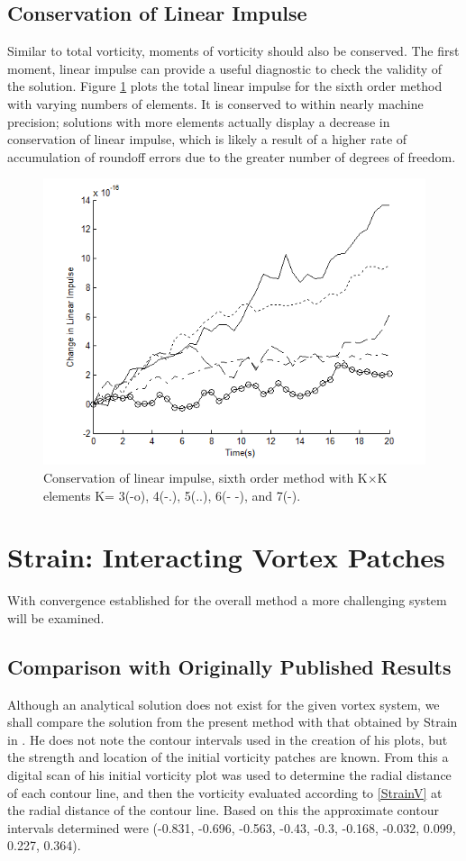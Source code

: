 \documentclass[letterpaper,12pt]{report}
\begin{document}
\subsection{Conservation of Linear Impulse}
Similar to total vorticity, moments of vorticity should also be conserved. The first moment, linear impulse can provide a useful diagnostic to check the validity of the solution. Figure \ref{fig:PLinImp} plots the total linear impulse for the sixth order method with varying numbers of elements. It is conserved to within nearly machine precision; solutions with more elements actually display a decrease in conservation of linear impulse, which is likely a result of a higher rate of accumulation of roundoff errors due to the greater number of degrees of freedom.
\begin{figure}
\centering
\includegraphics[width=1\textwidth]{PLinImp.PNG}
\caption{\label{fig:PLinImp}Conservation of linear impulse, sixth order method with K$\times$K elements K= 3(-o), 4(-.), 5(..), 6(- -), and 7(-).}
\end{figure}

\section{Strain: Interacting Vortex Patches}
With convergence established for the overall method a more challenging system will be examined.
%
\subsection{Comparison with Originally Published Results}\label{SComp}
Although an analytical solution does not exist for the given vortex system, we shall compare the solution from the present method with that obtained by Strain in \cite{Strain1996}. He does not note the contour intervals used in the creation of his plots, but the strength and location of the initial vorticity patches are known. From this a digital scan of his initial vorticity plot was used to determine the radial distance of each contour line, and then the vorticity evaluated according to \eqref{StrainV} at the radial distance of the contour line. Based on this the approximate contour intervals determined were (-0.831, -0.696, -0.563, -0.43, -0.3, -0.168, -0.032, 0.099, 0.227, 0.364).
\end{document}
